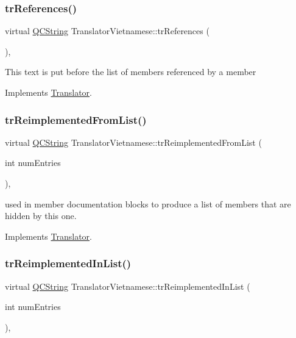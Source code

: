 \subsubsection{\texorpdfstring{trReferences()}{trReferences()}}
{\footnotesize\ttfamily virtual \mbox{\hyperlink{class_q_c_string}{Q\+C\+String}} Translator\+Vietnamese\+::tr\+References (\begin{DoxyParamCaption}{ }\end{DoxyParamCaption})\hspace{0.3cm}{\ttfamily [inline]}, {\ttfamily [virtual]}}

This text is put before the list of members referenced by a member 

Implements \mbox{\hyperlink{class_translator}{Translator}}.

\mbox{\label{class_translator_vietnamese_af3f68c6304668410d08a21f422cc2a02}} 
\subsubsection{\texorpdfstring{trReimplementedFromList()}{trReimplementedFromList()}}
{\footnotesize\ttfamily virtual \mbox{\hyperlink{class_q_c_string}{Q\+C\+String}} Translator\+Vietnamese\+::tr\+Reimplemented\+From\+List (\begin{DoxyParamCaption}\item[{int}]{num\+Entries }\end{DoxyParamCaption})\hspace{0.3cm}{\ttfamily [inline]}, {\ttfamily [virtual]}}

used in member documentation blocks to produce a list of members that are hidden by this one. 

Implements \mbox{\hyperlink{class_translator}{Translator}}.

\mbox{\label{class_translator_vietnamese_a1479a8da46f19bee798abb32108e84a4}} 
\subsubsection{\texorpdfstring{trReimplementedInList()}{trReimplementedInList()}}
{\footnotesize\ttfamily virtual \mbox{\hyperlink{class_q_c_string}{Q\+C\+String}} Translator\+Vietnamese\+::tr\+Reimplemented\+In\+List (\begin{DoxyParamCaption}\item[{int}]{num\+Entries }\end{DoxyParamCaption})\hspace{0.3cm}{\ttfamily [inline]}, {\ttfamily [virtual]}}

